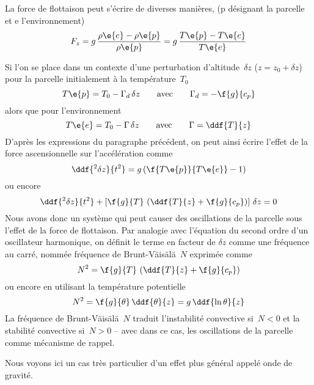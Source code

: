 \sk
La force de flottaison peut s'écrire de diverses manières,
(p désignant la parcelle et e l'environnement)
\[ F_z = g \, \frac{\rho\e{e}-\rho\e{p}}{\rho\e{p}} = g \, \frac{T\e{p}-T\e{e}}{T\e{e}}  \]

\sk
Si l'on se place dans un contexte d'une perturbation d'altitude~$\delta z$ ($z = z_0 + \delta z$) pour la parcelle initialement à la température~$T_0$
\[ T\e{p} = T_0 - \Gamma_d \, \delta z \qquad \textrm{avec} \qquad \Gamma_d = -\f{g}{c_p}  \]
alors que pour l'environnement
\[ T\e{e} = T_0 - \Gamma \, \delta z \qquad \textrm{avec} \qquad \Gamma = \ddf{T}{z} \]
\noindent D'après les expressions du paragraphe précédent,
on peut ainsi écrire l'effet de la force ascensionnelle
sur l'accélération comme
\[ \ddf{^2 \delta z}{t^2} = g \left( \f{T\e{p}}{T\e{e}} - 1 \right) \]
\noindent ou encore
\[ 
\ddf{^2 \delta z}{t^2} + \left[ \f{g}{T} \, \left( \ddf{T}{z} + \f{g}{c_p} \right)  \right] \, \delta z = 0
\]
\noindent Nous avons donc un système qui
peut causer des oscillations de la parcelle sous l'effet de la force de flottaison.
Par analogie avec l'équation du second ordre d'un
oscillateur harmonique, on définit le terme en
facteur de $\delta z$ comme une fréquence au carré, 
nommée fréquence de Brunt-V{\"a}is{\"a}l{\"a}~$N$
exprimée comme
\[ N^2 = \f{g}{T} \, \left( \ddf{T}{z} + \f{g}{c_p} \right) \]
\noindent ou encore en utilisant la température potentielle
\[ N^2 = \f{g}{\theta} \, \ddf{\theta}{z} = g \, \ddf{\ln\theta}{z} \]
\noindent La fréquence de Brunt-V{\"a}is{\"a}l{\"a}~$N$
traduit l'instabilité convective si~$N<0$
et la stabilité convective si~$N>0$ -- avec dans ce cas,
les oscillations de la parcelle comme mécanisme de rappel.

\sk
Nous voyons ici un cas très particulier d'un effet plus général appelé onde de gravité.
